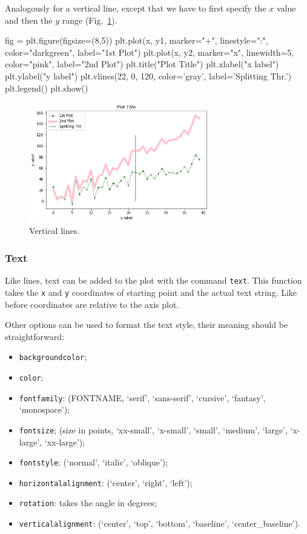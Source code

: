 Analogously for a vertical line, except that we have to first specify the $x$ value and then the $y$ range (Fig.~\ref{fig:lines2}).

\begin{ipython}
fig = plt.figure(figsize=(8,5))
plt.plot(x, y1, marker="+", linestyle=":", color="darkgreen", label="1st Plot")
plt.plot(x, y2, marker="x", linewidth=5, color="pink", label="2nd Plot")
plt.title("Plot Title")
plt.xlabel("x label")
plt.ylabel("y label")
plt.vlines(22, 0, 120, color='gray', label='Splitting Thr.')
plt.legend()
plt.show()
\end{ipython}

\begin{figure}[htb]
	\centering
	\includegraphics[width=0.7\textwidth]{figures/lines2}
	\caption{Vertical lines.}
	\label{fig:lines2}
\end{figure}

\subsubsection{Text}\label{text}

Like lines, text can be added to the plot with the command \texttt{text}.
This function takes the \texttt{x} and \texttt{y} coordinates of starting point and the actual text string. Like before coordinates are relative to the axis plot.

Other options can be used to format the text style, their meaning should be straightforward:

\begin{itemize}
\tightlist
\item \texttt{backgroundcolor};
\item \texttt{color};
\item \texttt{fontfamily}: (FONTNAME, `serif', `sans-serif', `cursive', `fantasy', `monospace');
\item \texttt{fontsize}; (size in points, `xx-small', `x-small', `small', `medium', `large', `x-large', `xx-large');
\item \texttt{fontstyle}: (`normal', `italic', `oblique');
\item \texttt{horizontalalignment}: (`center', `right', `left');
\item \texttt{rotation}: takes the angle in degrees;
\item \texttt{verticalalignment}: (`center', `top', `bottom', `baseline', `center\_baseline').
\end{itemize}

